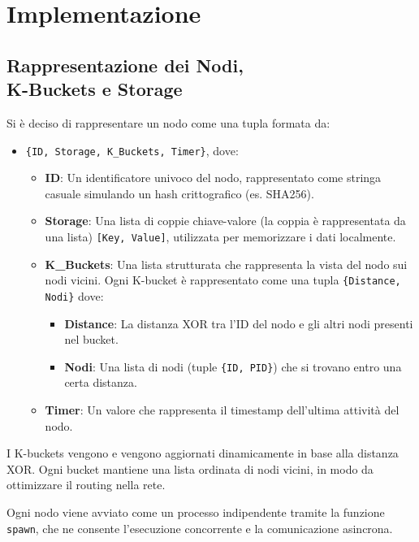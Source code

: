 \documentclass{article}
\begin{document}
\section{Implementazione}
\subsection{Rappresentazione dei Nodi,\\ K-Buckets e Storage}
Si è deciso di rappresentare un nodo come una tupla formata da:
\begin{itemize}
    \item \texttt{\{ID, Storage, K\_Buckets, Timer\}}, dove:
    \begin{itemize}
        \item \textbf{ID}: Un identificatore univoco del nodo, rappresentato come stringa casuale simulando un hash crittografico (es. SHA256).
        \item \textbf{Storage}: Una lista di coppie chiave-valore (la coppia è rappresentata da una lista) \texttt{[Key, Value]}, utilizzata per memorizzare i dati localmente.
        \item \textbf{K\_Buckets}: Una lista strutturata che rappresenta la vista del nodo sui nodi vicini. Ogni K-bucket è rappresentato come una tupla \texttt{\{Distance, Nodi\}} dove:
        \begin{itemize}
            \item \textbf{Distance}: La distanza XOR tra l'ID del nodo e gli altri nodi presenti nel bucket.
            \item \textbf{Nodi}: Una lista di nodi (tuple \texttt{\{ID, PID\}}) che si trovano entro una certa distanza.
        \end{itemize}
        \item \textbf{Timer}: Un valore che rappresenta il timestamp dell'ultima attività del nodo.
    \end{itemize}
\end{itemize}

I K-buckets vengono  e vengono aggiornati dinamicamente in base alla distanza XOR. Ogni bucket mantiene una lista ordinata di nodi vicini, in modo da ottimizzare il routing nella rete.

Ogni nodo viene avviato come un processo indipendente tramite la funzione \texttt{spawn}, che ne consente l'esecuzione concorrente e la comunicazione asincrona.
\end{document}
